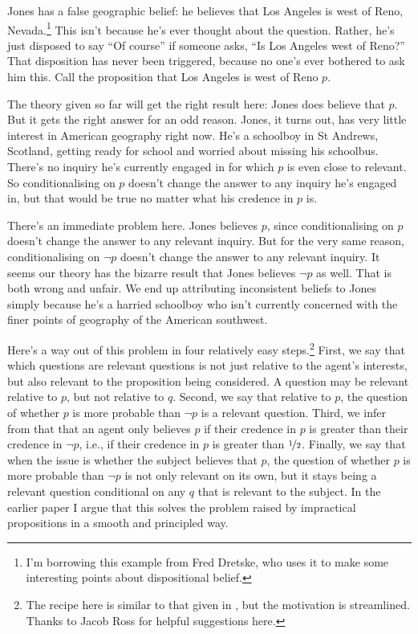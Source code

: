 Jones has a false geographic belief: he believes that Los Angeles is west of Reno, Nevada.\footnote{I'm borrowing this example from Fred Dretske, who uses it to make some interesting points about dispositional belief.} This isn't because he's ever thought about the question. Rather, he's just disposed to say ``Of course'' if someone asks, ``Is Los Angeles west of Reno?'' That disposition has never been triggered, because no one's ever bothered to ask him this. Call the proposition that Los Angeles is west of Reno $p$. 

The theory given so far will get the right result here: Jones does believe that $p$. But it gets the right answer for an odd reason. Jones, it turns out, has very little interest in American geography right now. He's a schoolboy in St Andrews, Scotland, getting ready for school and worried about missing his schoolbus. There's no inquiry he's currently engaged in for which $p$ is even close to relevant. So conditionalising on $p$ doesn't change the answer to any inquiry he's engaged in, but that would be true no matter what his credence in $p$ is.

There's an immediate problem here. Jones believes $p$, since conditionalising on $p$ doesn't change the answer to any relevant inquiry. But for the very same reason, conditionalising on $\neg p$ doesn't change the answer to any relevant inquiry. It seems our theory has the bizarre result that Jones believes $\neg p$ as well. That is both wrong and unfair. We end up attributing inconsistent beliefs to Jones simply because he's a harried schoolboy who isn't currently concerned with the finer points of geography of the American southwest.

Here's a way out of this problem in four relatively easy steps.\footnote{The recipe here is similar to that given in \cite{Weatherson2005-WEACWD}, but the motivation is streamlined. Thanks to Jacob Ross for helpful suggestions here.} First, we say that which questions are relevant questions is not just relative to the agent's interests, but also relevant to the proposition being considered. A question may be relevant relative to $p$, but not relative to $q$. Second, we say that relative to $p$, the question of whether $p$ is more probable than $\neg p$ is a relevant question. Third, we infer from that that an agent only believes $p$ if their credence in $p$ is greater than their credence in $\neg p$, i.e., if their credence in $p$ is greater than $\nicefrac{1}{2}$. Finally, we say that when the issue is whether the subject believes that $p$, the question of whether $p$ is more probable than $\neg p$ is not only relevant on its own, but it stays being a relevant question conditional on any $q$ that is relevant to the subject. In the earlier paper \citep{Weatherson2005-WEACWD} I argue that this solves the problem raised by impractical propositions in a smooth and principled way.

